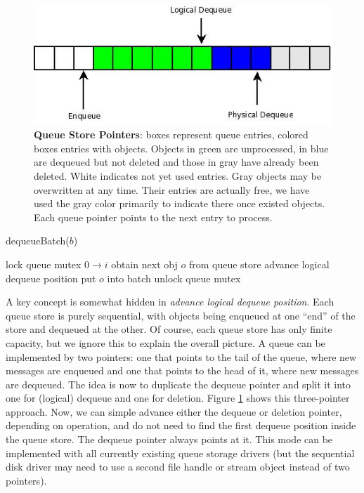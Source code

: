 \documentclass[a4paper,10pt]{article}
\begin{document}
\begin{figure}[h]
\begin{center}
\includegraphics[scale=0.6]{rsyslog_queue_pointers.jpeg}
\end{center}
\caption{\textbf{Queue Store Pointers}: boxes represent queue entries, colored boxes entries with objects. Objects in green are unprocessed, in blue are dequeued but not deleted and those in gray have already been deleted. White indicates not yet used entries. Gray objects may be overwritten at any time. Their entries are actually free, we have used the gray color primarily to indicate there once existed objects. Each queue pointer points to the next entry to process.}
\label{fig_queue_ptr}
\end{figure}

\begin{algorithm}
\caption{dequeueBatch($b$)}
\begin{algorithmic}
\label{alg_ldeq_batch_1}
\STATE lock queue mutex
\STATE $0 \to i$
	\STATE obtain next obj $o$ from queue store 
	\STATE advance logical dequeue position
	\STATE put $o$ into batch
\ENDWHILE
\STATE unlock queue mutex
\end{algorithmic}
\end{algorithm}

A key concept is somewhat hidden in  \emph{advance logical dequeue position}. Each queue store is purely sequential, with objects being enqueued at one ``end'' of the store and dequeued at the other. Of course, each queue store has only finite capacity, but we ignore this to explain the overall picture. A queue can be implemented by two pointers: one that points to the tail of the queue, where new messages are enqueued and one that points to the head of it, where new messages are dequeued. The idea is now to duplicate the dequeue pointer and split it into one for (logical) dequeue and one for deletion. Figure \ref{fig_queue_ptr} shows this three-pointer approach. Now, we can simple advance either the dequeue or deletion pointer, depending on operation, and do not need to find the first dequeue position inside the queue store. The dequeue pointer always points at it. This mode can be implemented with all currently existing queue storage drivers (but the sequential disk driver may need to use a second file handle or stream object instead of two pointers).
\end{document}
